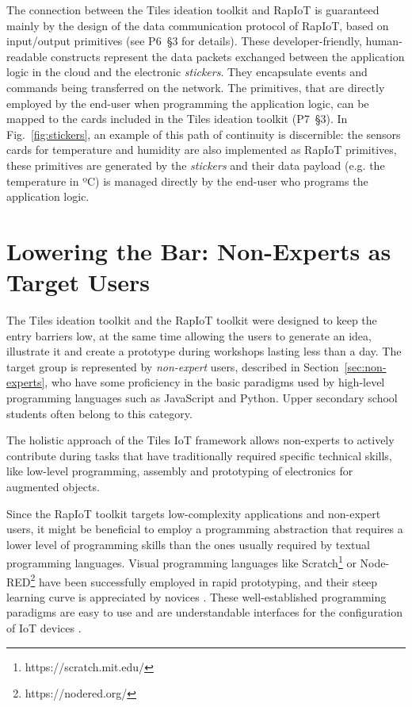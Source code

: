 The connection between the Tiles ideation toolkit and RapIoT is guaranteed mainly by the design of the data communication protocol of RapIoT, based on input/output primitives (see P6~\S3 for details). These developer-friendly, human-readable constructs represent the data packets exchanged between the application logic in the cloud and the electronic \textit{stickers}. They encapsulate events and commands being transferred on the network. The primitives, that are directly employed by the end-user when programming the application logic, can be mapped to the cards included in the Tiles ideation toolkit (P7~\S3). In Fig.~\ref{fig:stickers}, an example of this path of continuity is discernible: the sensors cards for temperature and humidity are also implemented as RapIoT primitives, these primitives are generated by the \textit{stickers} and their data payload (e.g. the temperature in ºC) is managed directly by the end-user who programs the application logic.


\section{Lowering the Bar: Non-Experts as Target Users}
\label{sec:non-experts-target}

The Tiles ideation toolkit and the RapIoT toolkit were designed to keep the entry barriers low, at the same time allowing the users to generate an idea, illustrate it and create a prototype during workshops lasting less than a day.
The target group is represented by \textit{non-expert} users, described in Section~\ref{sec:non-experts}, who have some proficiency in the basic paradigms used by high-level programming languages such as JavaScript and Python. Upper secondary school students often belong to this category.

The holistic approach of the Tiles IoT framework allows non-experts to actively contribute during tasks that have traditionally required specific technical skills, like low-level programming, assembly and prototyping of electronics for augmented objects.

Since the RapIoT toolkit targets low-complexity applications and non-expert users, it might be beneficial to employ a programming abstraction that requires a lower level of programming skills than the ones usually required by textual programming languages. Visual programming languages like Scratch\footnote{https://scratch.mit.edu/} or Node-RED\footnote{https://nodered.org/} have been successfully employed in rapid prototyping, and their steep learning curve is appreciated by novices \autocite{booth_end-user_2013}. These well-established programming paradigms are easy to use and are understandable interfaces for the configuration of IoT devices \autocite{houben_physikit_2016}.

